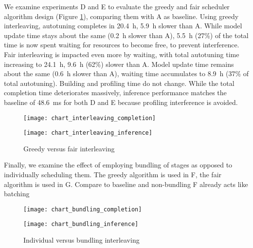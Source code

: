 We examine experiments D and E to evaluate the greedy and fair scheduler algorithm design (Figure \ref{fig:chart-interleaving}), comparing them with A as baseline. Using greedy interleaving, autotuning completes in \SI{20.4}{\hour}, \SI{5.9}{\hour} slower than A. While model update time stays about the same (\SI{0.2}{\hour} slower than A), \SI{5.5}{\hour} (27\%) of the total time is now spent waiting for resources to become free, to prevent interference. Fair interleaving is impacted even more by waiting, with total autotuning time increasing to \SI{24.1}{\hour}, \SI{9.6}{\hour} (62\%) slower than A. Model update time remains about the same (\SI{0.6}{\hour} slower than A), waiting time accumulates to \SI{8.9}{\hour} (37\% of total autotuning). Building and profiling time do not change. While the total completion time deteriorates massively, inference performance matches the baseline of \SI{48.6}{\milli\second} for both D and E because profiling interference is avoided.

\begin{figure}[ht]
	\begin{minipage}[b]{.6\textwidth}
		\centering\texttt{[image: chart\_interleaving\_completion]}
		\label{fig:chart-interleaving-completion}
	\end{minipage}%
	\hfill
	\begin{minipage}[b]{.35\textwidth}
		\centering\texttt{[image: chart\_interleaving\_inference]}
		\label{fig:chart-interleaving-inference}
	\end{minipage}
	\caption[Result of greedy versus fair interleaving]{Greedy versus fair interleaving}
	\label{fig:chart-interleaving}
\end{figure}

Finally, we examine the effect of employing bundling of stages as opposed to individually scheduling them. The greedy algorithm is used in F, the fair algorithm is used in G.
Compare to baseline and non-bundling
F already acts like batching

\begin{figure}[ht]
	\begin{minipage}[b]{.6\textwidth}
		\centering\texttt{[image: chart\_bundling\_completion]}
		\label{fig:chart-bundling-completion}
	\end{minipage}%
	\hfill
	\begin{minipage}[b]{.35\textwidth}
		\centering\texttt{[image: chart\_bundling\_inference]}
		\label{fig:chart-bundling-inference}
	\end{minipage}
	\caption[Result of individual versus bundling interleaving]{Individual versus bundling interleaving}
	\label{fig:chart-bundling}
\end{figure}

